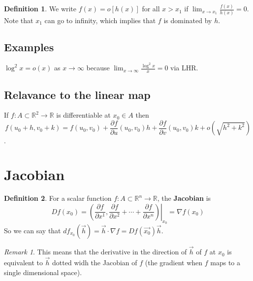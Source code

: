 \documentclass[12pt]{article}
\newcommand{\R}{\mathbb{R}}
\theoremstyle{definition}
\newtheorem{definition}{Definition}[section]
\theoremstyle{remark}
\newtheorem*{remark}{Remark}
\begin{document}
\begin{definition}
    We write $f(x)=o[h(x)]$ for all $x>x_1$ if $\lim_{x\to x_1}\frac{f(x)}{h(x)}=0$. Note that $x_1$ can go to infinity, which implies that $f$ is dominated by $h$.
\end{definition}
\subsection{Examples}
$\log^2x=o(x)$ as $x\to\infty$ because $\lim_{x\to\infty}\frac{\log^2x}{x}=0$ via LHR.
\subsection{Relavance to the linear map}
If $f:A\subset\R^2\to\R$ is differentiable at $x_0\in A$ then $$f(u_0+h,v_0+k)=f(u_0,v_0)+\frac{\partial f}{\partial u}(u_0,v_0)h+\frac{\partial f}{\partial v}(u_0,v_0)k+o(\sqrt{h^2+k^2})$$.


\section{Jacobian}
\begin{definition}
    For a scalar function $f:A\subset\R^n\to\R$, the \textbf{Jacobian} is 
    $$Df(x_0)=\left.\left(\frac{\partial f}{\partial x^1},\frac{\partial f}{\partial x^2}+\cdots+\frac{\partial f}{\partial x^n}\right)\right|_{x_0}=\nabla f(x_0)$$
    So we can say that $df_{x_0}(\vec{h})=\vec{h}\cdot\nabla f=Df(\vec{x_0})\vec{h}$.
\end{definition}
\begin{remark}
    This means that the derivative in the direction of $\vec{h}$ of $f$ at $x_0$ is equivalent to $\vec{h}$ dotted widh the Jacobian of $f$ (the gradient when $f$ maps to a single dimensional space).
\end{remark}
\end{document}

